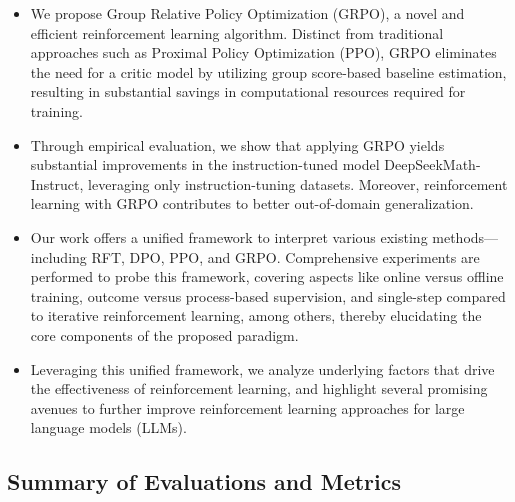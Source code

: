 \begin{itemize}[topsep=0pt]
    \item We propose Group Relative Policy Optimization (GRPO), a novel and efficient reinforcement learning algorithm. Distinct from traditional approaches such as Proximal Policy Optimization (PPO), GRPO eliminates the need for a critic model by utilizing group score-based baseline estimation, resulting in substantial savings in computational resources required for training.
    \item Through empirical evaluation, we show that applying GRPO yields substantial improvements in the instruction-tuned model DeepSeekMath-Instruct, leveraging only instruction-tuning datasets. Moreover, reinforcement learning with GRPO contributes to better out-of-domain generalization.
    \item Our work offers a unified framework to interpret various existing methods—including RFT, DPO, PPO, and GRPO. Comprehensive experiments are performed to probe this framework, covering aspects like online versus offline training, outcome versus process-based supervision, and single-step compared to iterative reinforcement learning, among others, thereby elucidating the core components of the proposed paradigm.
    \item Leveraging this unified framework, we analyze underlying factors that drive the effectiveness of reinforcement learning, and highlight several promising avenues to further improve reinforcement learning approaches for large language models (LLMs).
\end{itemize}

\subsection{Summary of Evaluations and Metrics}

